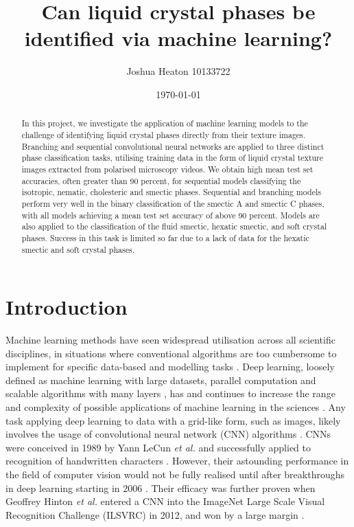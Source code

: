 \documentclass[12pt]{article}
\begin{document}
\title{Can liquid crystal phases be identified via machine learning?}
\author{Joshua Heaton 10133722}
\date{\today}

\maketitle

\begin{abstract}
In this project, we investigate the application of machine learning models to the challenge of identifying liquid crystal phases directly from their texture images. Branching and sequential convolutional neural networks are applied to three distinct phase classification tasks, utilising training data in the form of liquid crystal texture images extracted from polarised microscopy videos. We obtain high mean test set accuracies, often greater than 90 percent, for sequential models classifying the isotropic, nematic, cholesteric and smectic phases. Sequential and branching models perform very well in the binary classification of the smectic A and smectic C phases, with all models achieving a mean test set accuracy of above 90 percent. Models are also applied to the classification of the fluid smectic, hexatic smectic, and soft crystal phases. Success in this task is limited so far due to a lack of data for the hexatic smectic and soft crystal phases.
\end{abstract}

\newpage
\tableofcontents

\newpage
{}

\section{Introduction}
Machine learning methods have seen widespread utilisation across all scientific disciplines, in situations where conventional algorithms are too cumbersome to implement for specific data-based and modelling tasks \cite{Carleo19}. Deep learning, loosely defined as machine learning with large datasets, parallel computation and scalable algorithms with many layers \cite{Goodfellow16}, has and continues to increase the range and complexity of possible applications of machine learning in the sciences \cite{Carleo19}. Any task applying deep learning to data with a grid-like form, such as images, likely involves the usage of convolutional neural network (CNN) algorithms \cite{Goodfellow16}. CNNs were conceived in 1989 by Yann LeCun \textit{et al.} and successfully applied to recognition of handwritten characters \cite{LeCun89}. However, their astounding performance in the field of computer vision would not be fully realised until after breakthroughs in deep learning starting in 2006 \cite{Goodfellow16}. Their efficacy was further proven when Geoffrey Hinton \textit{et al.} entered a CNN into the ImageNet Large Scale Visual Recognition Challenge (ILSVRC) in 2012, and won by a large margin \cite{ILSVRC15}.
\end{document}
